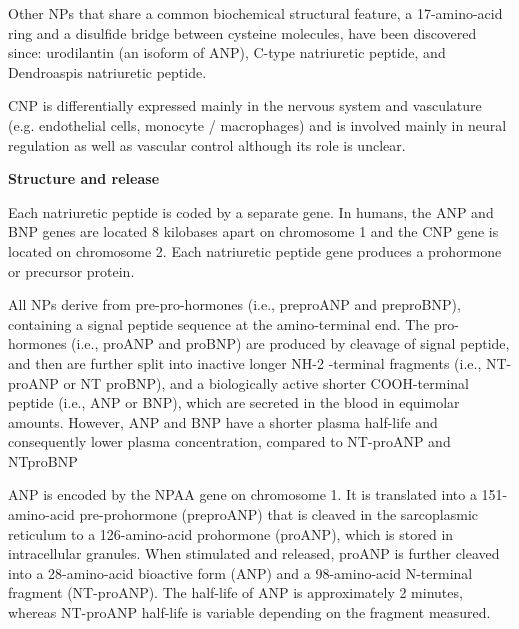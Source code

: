 \documentclass[14pt,a4paper,onecolumn]{extarticle}
\begin{document}
Other NPs that share a common biochemical structural feature, a 17-amino-acid ring and a disulfide bridge between cysteine molecules, have been discovered since: urodilantin (an isoform of ANP), C-type natriuretic peptide, and Dendroaspis natriuretic peptide. \citep{Gaggin2014} %

CNP is differentially expressed mainly in the nervous system and vasculature (e.g. endothelial cells, monocyte / macrophages) and is involved mainly in neural regulation as well as vascular control although its role is unclear. \citep{Suzuki2001} %


\textbf{Structure and release}

Each natriuretic peptide is coded by a separate gene. In humans, the ANP and BNP genes are located 8 kilobases apart on chromosome 1 and the CNP gene is located on chromosome 2. Each natriuretic peptide gene produces a prohormone or precursor protein. \citep{Suzuki2001} %

All NPs derive from pre-pro-hormones (i.e., preproANP and preproBNP), containing a signal peptide sequence at the amino-terminal end. The pro-hormones (i.e., proANP and proBNP) are produced by cleavage of signal peptide, and then are further split into inactive longer NH-2 -terminal fragments (i.e., NT-proANP or NT proBNP), and a biologically active shorter COOH-terminal peptide (i.e., ANP or BNP), which are secreted in the blood in equimolar amounts. However, ANP and BNP have a shorter plasma half-life and consequently lower plasma concentration, compared to NT-proANP and NTproBNP \citep{bib35} \citep{bib36} \citep{bib37}

ANP is encoded by the NPAA gene on chromosome 1. It is translated into a 151-amino-acid pre-prohormone (preproANP) that is cleaved in the sarcoplasmic reticulum to a 126-amino-acid prohormone (proANP), which is stored in intracellular granules.  When stimulated and released, proANP is further cleaved into a 28-amino-acid bioactive form (ANP) and a 98-amino-acid N-terminal fragment (NT-proANP). The half-life of ANP is approximately 2 minutes, whereas NT-proANP half-life is variable depending on the fragment measured. \citep{Volpe2016} %
\end{document}
